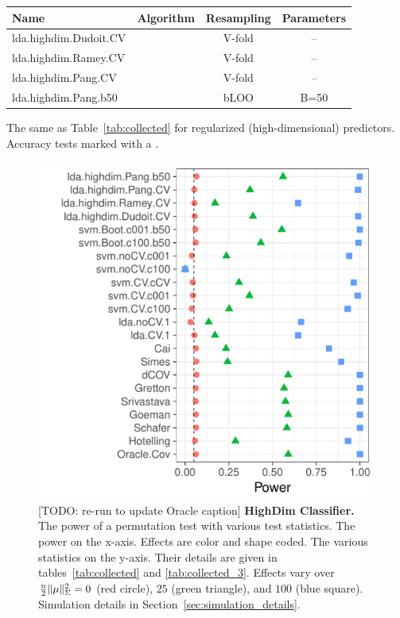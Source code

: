 \documentclass[]{bio}
\begin{document}
\bigskip

\begin{tcolorbox}
	\centering
	\footnotesize
	\begin{tabular}{l|c|c|c}
		Name & Algorithm & Resampling &  Parameters\\ 
		\hline
		\hline
		\cue lda.highdim.Dudoit.CV & \cite{dudoit_comparison_2002} & V-fold & -- \\ 
		\cue lda.highdim.Ramey.CV & \cite{ramey_high-dimensional_2016} & V-fold & -- \\ 
		\cue lda.highdim.Pang.CV & \cite{pang_shrinkage-based_2009} & V-fold & -- \\ 
		\cue lda.highdim.Pang.b50 & \cite{pang_shrinkage-based_2009} & bLOO 	 & B=50 \\ 
	\end{tabular} 
	\captionsetup{type=table}
	\caption{\footnotesize
		The same as Table~\ref{tab:collected} for regularized (high-dimensional) predictors. 
		Accuracy tests marked with a \cue.
	} 
	\label{tab:collected_3}
\end{tcolorbox}


\begin{figure}[ht]
	\centering
	\includegraphics[width=0.5\columnwidth]{"art/file14"}
	\caption{[TODO: re-run to update Oracle caption]
		\textbf{HighDim Classifier.} 
		The power of a permutation test with various test statistics. 
		The power on the x-axis. 
		Effects are color and shape coded. 
		The various statistics on the y-axis. 
		Their details are given in tables~\ref{tab:collected} and \ref{tab:collected_3}. 
		Effects vary over $\frac{n}{2}\Vert \mu \Vert^2_\Sigma=0$ (red circle), $25$ (green triangle), and $100$ (blue square). 
		Simulation details in Section~\ref{sec:simulation_details}.
	} 
	\label{fig:highdim}
\end{figure}
\end{document}
